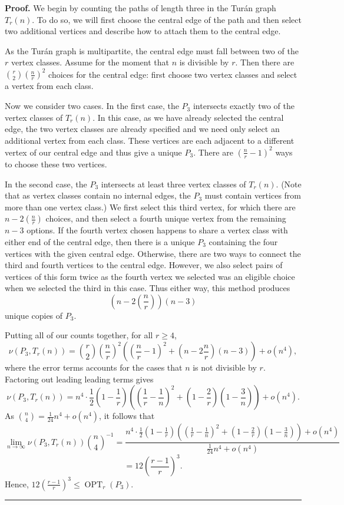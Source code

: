 \documentclass[12pt]{article}
\DeclareMathOperator{\OPT}{OPT}
\renewenvironment{proof}[1][Proof]{\textbf{#1.} }{\ \rule{0.5em}{0.5em}}
\begin{document}
\begin{proof} 
We begin by counting the paths of length three in the Tur\'an graph $T_r(n)$. To
do so, we will first choose the central edge of the path and then select two
additional vertices and describe how to attach them to the central edge.

As the Tur\'an graph is multipartite, the central edge must fall between two
of the $r$ vertex classes. Assume for the moment that $n$ is divisible by $r$.
Then there are $\binom{r}{2}(\frac{n}{r})^2$ choices for the central edge: first
choose two vertex classes and select a vertex from each class.

Now we consider two cases. In the first case, the $P_3$ intersects exactly two
of the vertex classes of $T_r(n)$. In this case, as we have already selected the
central edge, the two vertex classes are already specified and we need only
select an additional vertex from each class. These vertices are each adjacent to
a different vertex of our central edge and thus give a unique $P_3$. There are
$(\frac{n}{r}-1)^2$ ways to choose these two vertices.

In the second case, the $P_3$ intersects at least three vertex classes of
$T_r(n)$. (Note that as vertex classes contain no internal edges, the $P_3$ must
contain vertices from more than one vertex class.) We first select this third
vertex, for which there are $n-2(\frac{n}{r})$ choices, and then select a fourth
unique vertex from the remaining $n-3$ options. If the fourth vertex chosen
happens to share a vertex class with either end of the central edge, then there
is a unique $P_3$ containing the four vertices with the given central edge.
Otherwise, there are two ways to connect the third and fourth vertices to the
central edge. However, we also select pairs of vertices of this form twice as
the fourth vertex we selected was an eligible choice when we selected the third
in this case. Thus either way, this method produces
\[ \left(n-2\left(\frac{n}{r}\right)\right)(n-3) \]
unique copies of $P_3$.

Putting all of our counts together, for all $r \geq 4$, 
\[
\nu(P_3,T_r(n)) = \binom{r}{2}\left(\frac{n}{r}\right)^2\left(
\left(\frac{n}{r} - 1\right)^2 + \left(n - 2\frac{n}{r} \right)(n-3) \right) + o(n^4),
\]
where the error terms accounts for the cases that $n$ is not divisible by $r$.
Factoring out leading leading terms  gives
\[ \nu(P_3,T_r(n)) = n^4 \cdot \frac{1}{2}\left(1 - \frac{1}{r}\right)\left(
\left( \frac{1}{r} - \frac{1}{n}\right)^2 + \left(1 - \frac{2}{r}\right)\left(1
- \frac{3}{n}\right) \right) + o(n^4).\]
As $\binom{n}{4} = \frac{1}{24}n^4 + o(n^4)$, it follows that 
\[ \lim\limits_{n \to \infty} \nu(P_3,T_r(n))\binom{n}{4}^{-1} = \frac{n^4 \cdot \frac{1}{2}\left(1 - \frac{1}{r}\right)\left( \left( \frac{1}{r} - \frac{1}{n}\right)^2 + \left(1 - \frac{2}{r}\right)\left(1 - \frac{3}{n}\right) \right) + o(n^4)}{\frac{1}{24}n^4 + o(n^4)} \] \[ = 12\left(\frac{r-1}{r}\right)^3.\]
Hence, $12\left(\frac{r-1}{r}\right)^3 \leq \OPT_r(P_3)$. 
\end{proof}
\end{document}
